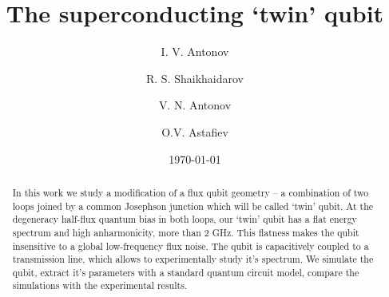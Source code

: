\documentclass[%
reprint,
superscriptaddress,
bibnotes,
amsmath,
amssymb,
aps,
showkeys,
prb,
]{revtex4-1}
\begin{document}

\title{The superconducting `twin' qubit}

\author{I.  V.  Antonov}   

\author{R. S.  Shaikhaidarov} 

\author{V.  N.  Antonov}   

\author{O.V.  Astafiev}   

\date{\today}%

\begin{abstract}
  In this work  we study a modification of  a flux qubit geometry --  a combination of
  two loops joined by a common Josephson  junction which will be called `twin' qubit.  At the degeneracy half-flux quantum bias in both loops, our `twin' qubit has a flat energy
  spectrum and high anharmonicity, more than 2 GHz. This flatness makes the qubit insensitive to
  a global  low-frequency flux  noise.  The  qubit is capacitively  coupled to  a transmission
  line, which  allows to experimentally  study it's  spectrum.
  We simulate the qubit, extract it's parameters with a standard quantum circuit model, compare the simulations with the experimental results.
\end{abstract}


\maketitle
\end{document}
